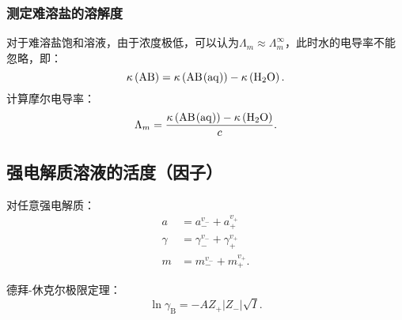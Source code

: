 \subsubsection{测定难溶盐的溶解度}%
\label{ssub*:测定难溶盐的溶解度}
对于难溶盐饱和溶液，由于浓度极低，可以认为$\Lambda_{m} \approx \Lambda_{m}^{\infty }$，此时水的电导率不能忽略，即：\[
    \kappa\left( \ce{AB} \right) = \kappa\left( \ce{AB(aq)} \right)-\kappa\left( \ce{H_2O} \right)
.\]
计算摩尔电导率：\[
    \Lambda_{m} = \frac{\kappa\left( \ce{AB(aq)} \right)-\kappa\left( \ce{H_2O} \right)}{c}
.\]
\subsection{强电解质溶液的活度（因子）}%
\label{sub:强电解质溶液的活度（因子）}
对任意强电解质：
\begin{align*}
    a &= a_-^{v_-}+a_+^{v_+}\\
    \gamma &= \gamma_-^{v_-}+\gamma_+^{v_+}\\
    m &= m_-^{v_-}+m_+^{v_+}
.\end{align*}
\begin{notation}
    德拜-休克尔极限定理：\[
        \ln \gamma_\text{B} = -AZ_+\left| Z_- \right|\sqrt{I}
    .\]
\end{notation}
